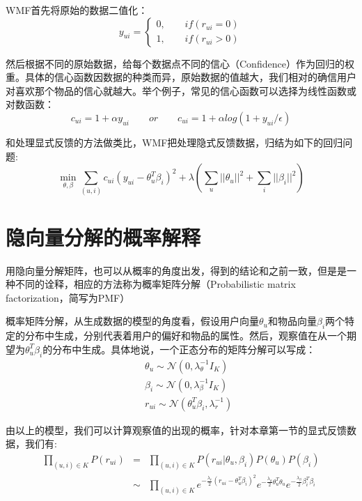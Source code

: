 \documentclass[notitlepage,cs4size,punct,oneside]{ctexrep}
\numberwithin{equation}{chapter}
\theoremstyle{mystyle}
\begin{document}
\par
WMF首先将原始的数据二值化：
$$ y_{ui}=\left\{
\begin{aligned}
0, \qquad if (r_{ui}=0) \\
1, \qquad if (r_{ui}>0)
\end{aligned}
\right.
$$
\par
然后根据不同的原始数据，给每个数据点不同的信心（Confidence）作为回归的权重。具体的信心函数因数据的种类而异，原始数据的值越大，我们相对的确信用户对喜欢那个物品的信心就越大。举个例子，常见的信心函数可以选择为线性函数或对数函数：
\begin{equation}\nonumber
c_{ui}=1+\alpha y_{ui}\qquad or \qquad
c_{ui}=1+\alpha log(1+y_{ui}/\epsilon)
\end{equation}
\par
和处理显式反馈的方法做类比，WMF把处理隐式反馈数据，归结为如下的回归问题:
\begin{equation}\label{ImplicitMF}
\min_{\theta,\beta}\sum_{(u,i)}c_{ui}(y_{ui}-\theta_u^T\beta_i)^2+\lambda(\sum_u||\theta_u||^2+\sum_i||\beta_i||^2)
\end{equation}



\section{隐向量分解的概率解释}
用隐向量分解矩阵，也可以从概率的角度出发，得到的结论和之前一致，但是是一种不同的诠释，相应的方法称为概率矩阵分解（Probabilistic matrix factorization，简写为PMF）\cite{PMF}
\par
概率矩阵分解，从生成数据的模型的角度看，假设用户向量$\theta_u$和物品向量$\beta_i$两个特定的分布中生成，分别代表着用户的偏好和物品的属性。然后，观察值在从一个期望为$\theta_u^T\beta_i$的分布中生成。具体地说，一个正态分布的矩阵分解可以写成：
\begin{eqnarray*}
&&\theta_u  \sim  \mathcal{N}(0,\lambda_\theta^{-1} I_K)\\
&&\beta_i  \sim  \mathcal{N}(0,\lambda_\beta^{-1} I_K)\\
&&r_{ui} \sim \mathcal{N}(\theta_u^T\beta_i,\lambda_r^{-1} )
\end{eqnarray*}

\par
由以上的模型，我们可以计算观察值的出现的概率，针对本章第一节的显式反馈数据，我们有:
\begin{eqnarray*}
\prod _{(u,i)\in K} P(r_{ui})&=& \prod _{(u,i)\in K} P(r_{ui}|\theta_u,\beta_i)P(\theta_u)P(\beta_i)\\
&\sim& \prod _{(u,i)\in K}e^{-\frac{\lambda_r}{2}(r_{ui}-\theta_u^T\beta_i)^2}e^{-\frac{\lambda_\theta}{2}\theta_u^T\theta_u}e^{-\frac{\lambda_\beta}{2}\beta_i^T\beta_i}
\end{eqnarray*}
\end{document}
